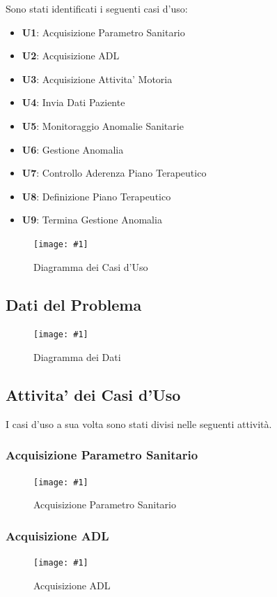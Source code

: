 \documentclass[a4paper,11pt,oneside, table]{article}
\newcommand{\putimage}[4] {
	\begin{figure}[H]
	    \centering
	    \texttt{[image: \#1]}
	    \caption{#2}\label{#3}
	\end{figure}
}
\begin{document}
Sono stati identificati i seguenti casi d'uso:
\begin{itemize}
  \item \textbf{U1}: Acquisizione Parametro Sanitario
  \item \textbf{U2}: Acquisizione ADL
  \item \textbf{U3}: Acquisizione Attivita' Motoria
  \item \textbf{U4}: Invia Dati Paziente
  \item \textbf{U5}: Monitoraggio Anomalie Sanitarie
  \item \textbf{U6}: Gestione Anomalia
  \item \textbf{U7}: Controllo Aderenza Piano Terapeutico
  \item \textbf{U8}: Definizione Piano Terapeutico
  \item \textbf{U9}: Termina Gestione Anomalia
\end{itemize}

\putimage{images/Diagramma dei Casi d'Uso.png}{Diagramma dei Casi d'Uso}{png:diagramma-dei-casi-duso}{1}

\subsection{Dati del Problema}

\putimage{images/Diagramma dei Dati.png}{Diagramma dei Dati}{png:diagramma-dei-dati}{1}

\subsection{Attivita' dei Casi d'Uso}

I casi d'uso a sua volta sono stati divisi nelle seguenti attivit\`a.

\subsubsection{Acquisizione Parametro Sanitario}

\putimage{images/Diagramma delle Attivita'/Acquisizione Parametro Sanitario.png}{Acquisizione Parametro Sanitario}{png:act:acquisizione-parametro-sanitario}{1}

\subsubsection{Acquisizione ADL}

\putimage{images/Diagramma delle Attivita'/Acquisizione ADL.png}{Acquisizione ADL}{png:act:acquisizione-adl}{1}
\end{document}
